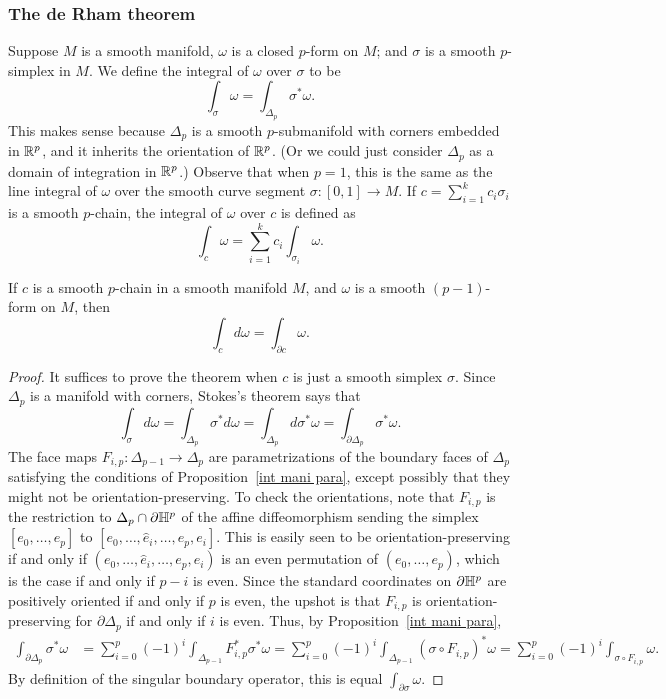 \subsubsection{The de Rham theorem}
Suppose $M$ is a smooth manifold, $\omega$ is a closed $p$-form on $M$; and $\sigma$ is a smooth $p$-simplex in $M$. We define the integral of $\omega$ over $\sigma$ to 
be
\[\int_{\sigma}\omega=\int_{\Delta_p}\sigma^*\omega.\]
This makes sense because $\Delta_p$ is a smooth $p$-submanifold with corners embedded in $\mathbb{R}^p$, and it inherits the orientation of $\mathbb{R}^p$. (Or we could just consider $\Delta_p$ 
as a domain of integration in $\mathbb{R}^p$.) Observe that when $p=1$, this is the same as the line integral of $\omega$ over the smooth curve segment $\sigma:[0,1]\to M$. If 
$c=\sum_{i=1}^{k}c_i\sigma_i$ is a smooth $p$-chain, the integral of $\omega$ over $c$ is defined as
\[\int_{c}\omega=\sum_{i=1}^{k}c_i\int_{\sigma_i}\omega.\]
\begin{theorem}\label{Stokes's theorem for chains}
If $c$ is a smooth $p$-chain in a smooth manifold $M$, and $\omega$ is a smooth $(p-1)$-form on $M$, then
\[\int_cd\omega=\int_{\partial c}\omega.\]
\end{theorem}
\begin{proof}
It suffices to prove the theorem when $c$ is just a smooth simplex $\sigma$. Since $\Delta_p$ is a manifold with corners, Stokes's theorem says that
\[\int_{\sigma}d\omega=\int_{\Delta_p}\sigma^*d\omega=\int_{\Delta_p}d\sigma^*\omega=\int_{\partial\Delta_p}\sigma^*\omega.\]
The face maps $F_{i,p}:\Delta_{p-1}\to\Delta_p$ are parametrizations of the boundary faces of $\Delta_p$ satisfying the conditions of Proposition~\ref{int mani para}, 
except possibly that they might not be orientation-preserving. To check the orientations, note that $F_{i,p}$ is the restriction to $\Delta_p\cap\partial\mathbb{H}^p$ of the 
affine diffeomorphism sending the simplex $[e_0,\dots,e_p]$ to $[e_0,\dots,\widehat{e}_i,\dots,e_p,e_i]$. This is easily seen to be orientation-preserving if and only 
if $(e_0,\dots,\widehat{e}_i,\dots,e_p,e_i)$ is an even permutation of $(e_0,\dots,e_p)$, which is the case if and only if $p-i$ is even. Since the standard coordinates 
on $\partial\mathbb{H}^p$ are positively oriented if and only if $p$ is even, the upshot is that $F_{i,p}$ is orientation-preserving for $\partial\Delta_p$ if and only if $i$ is 
even. Thus, by Proposition~\ref{int mani para},
\begin{align*}
\int_{\partial\Delta_p}\sigma^*\omega&=\sum_{i=0}^{p}(-1)^i\int_{\Delta_{p-1}}F_{i,p}^*\sigma^*\omega=\sum_{i=0}^{p}(-1)^i\int_{\Delta_{p-1}}(\sigma\circ F_{i,p})^*\omega=\sum_{i=0}^{p}(-1)^i\int_{\sigma\circ F_{i,p}}\omega.
\end{align*}
By definition of the singular boundary operator, this is equal $\int_{\partial\sigma}\omega$.
\end{proof}
